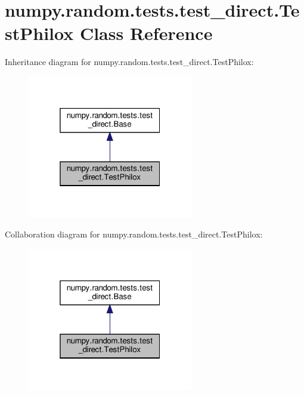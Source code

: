 \hypertarget{classnumpy_1_1random_1_1tests_1_1test__direct_1_1TestPhilox}{}\section{numpy.\+random.\+tests.\+test\+\_\+direct.\+Test\+Philox Class Reference}
\label{classnumpy_1_1random_1_1tests_1_1test__direct_1_1TestPhilox}


Inheritance diagram for numpy.\+random.\+tests.\+test\+\_\+direct.\+Test\+Philox\+:
\nopagebreak
\begin{figure}[H]
\begin{center}
\leavevmode
\includegraphics[width=205pt]{classnumpy_1_1random_1_1tests_1_1test__direct_1_1TestPhilox__inherit__graph}
\end{center}
\end{figure}


Collaboration diagram for numpy.\+random.\+tests.\+test\+\_\+direct.\+Test\+Philox\+:
\nopagebreak
\begin{figure}[H]
\begin{center}
\leavevmode
\includegraphics[width=205pt]{classnumpy_1_1random_1_1tests_1_1test__direct_1_1TestPhilox__coll__graph}
\end{center}
\end{figure}
